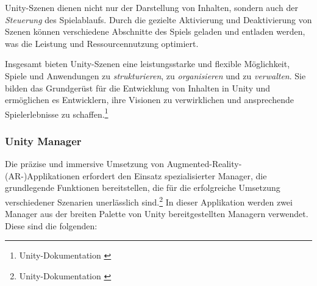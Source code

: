 Unity-Szenen dienen nicht nur der Darstellung von Inhalten, sondern auch der \textit{Steuerung} des Spielablaufs. Durch die gezielte
Aktivierung und Deaktivierung von Szenen können verschiedene Abschnitte des Spiels geladen und entladen werden, was die
Leistung und Ressourcennutzung optimiert.

Insgesamt bieten Unity-Szenen eine leistungsstarke und flexible Möglichkeit, Spiele und Anwendungen zu \textit{strukturieren}, zu
\textit{organisieren} und zu \textit{verwalten}. Sie bilden das Grundgerüst für die Entwicklung von Inhalten in Unity und ermöglichen es
Entwicklern, ihre Visionen zu verwirklichen und ansprechende Spielerlebnisse zu schaffen.\footnote{Unity-Dokumentation \cite{Scenes}}

\subsubsection{Unity Manager}
Die präzise und immersive Umsetzung von Augmented-Reality-(AR-)Applikationen erfordert den Einsatz spezialisierter Manager,
die grundlegende Funktionen bereitstellen, die für die erfolgreiche Umsetzung verschiedener Szenarien unerlässlich sind.\footnote{Unity-Dokumentation \cite{Managers}}
In dieser Applikation werden zwei Manager aus der breiten Palette von Unity bereitgestellten Managern verwendet. Diese
sind die folgenden:
